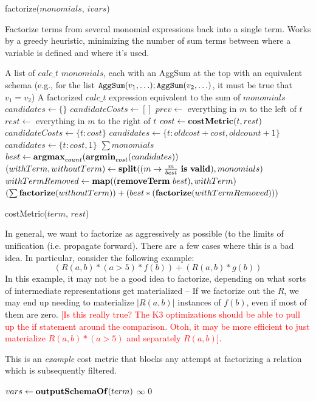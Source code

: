 \documentclass[11pt]{amsart}
\newcommand{\todo}[1]{\textcolor{red}{[#1]}}
\begin{document}
\begin{algorithm}
\caption{factorize($monomials$, $ivars$)}
Factorize terms from several monomial expressions back into a single term.
Works by a greedy heuristic, minimizing the number of sum terms between where a variable is defined and where it's used. 
\begin{algorithmic}[1]
\REQUIRE A list of $calc\_t$ $monomials$, each with an AggSum at the top with an equivalent schema (e.g., for the list ${\tt AggSum}(v_1, \ldots); {\tt AggSum}(v_2, \ldots)$, it must be true that $v_1 = v_2$)
\ENSURE A factorized $calc\_t$ expression equivalent to the sum of $monomials$
\STATE $candidates \gets \{\}$
  \STATE $candidateCosts \gets []$
    \STATE $prev \gets $ everything in $m$ to the left of $t$
    \STATE $rest \gets $ everything in $m$ to the right of $t$    
      \STATE $cost \gets {\bf costMetric}(t, rest)$
        \STATE $candidateCosts \gets \{t:cost\}$
      \ENDIF
    \ENDIF
  \ENDFOR
      \STATE $candidates \gets \{t:oldcost+cost, oldcount+1\}$
    \ELSE
      \STATE $candidates \gets \{t:cost, 1\}$
    \ENDIF
  \ENDFOR
\ENDFOR
{}
  \RETURN $\sum monomials$
\ELSE
  \STATE $best \gets {\bf argmax}_{count}({\bf argmin}_{cost}(candidates))$
  \STATE $(withTerm,withoutTerm) \gets {\bf split}((m \rightarrow \frac{m}{best}\ {\bf is\ valid}),monomials)$
  \STATE $withTermRemoved \gets {\bf map}(({\bf removeTerm}\ best), withTerm)$
  \RETURN $(\sum {\bf factorize}(withoutTerm)) + (best * ({\bf factorize}(withTermRemoved)))$
\ENDIF
\end{algorithmic}
\end{algorithm}

\begin{algorithm}
\caption{costMetric($term$, $rest$)}
In general, we want to factorize as aggressively as possible (to the limits of unification (i.e. propagate forward).  There are a few cases where this is a bad idea.  In particular, consider the following example:
$$(R(a,b) * (a > 5) * f(b)) + (R(a,b) * g(b))$$
In this example, it may not be a good idea to factorize, depending on what sorts of intermediate representations get materialized -- If we factorize out the $R$, we may end up needing to materialize $|R(a,b)|$ instances of $f(b)$, even if most of them are zero.  \todo{Is this really true?  The K3 optimizations should be able to pull up the if statement around the comparison.  Otoh, it may be more efficient to just materialize $R(a,b)*(a > 5)$ and separately $R(a,b)$}. 

This is an {\em example} cost metric that blocks any attempt at factorizing a relation which is subsequently filtered.
\begin{algorithmic}
\STATE $vars \gets {\bf outputSchemaOf}(term)$
      \RETURN $\infty$
    \ENDIF
  \ENDIF
\ENDFOR
\RETURN $0$
\end{algorithmic}
\end{algorithm}
\end{document}
